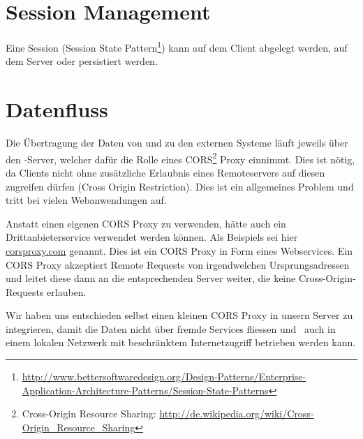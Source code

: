 \section{Session Management}
	Eine Session (Session State Pattern\footnote{\url{http://www.bettersoftwaredesign.org/Design-Patterns/Enterprise-Application-Architecture-Patterns/Session-State-Patterns}}) kann auf dem Client abgelegt werden, auf dem Server oder persistiert werden.
	
		
	\section{Datenfluss}			
		Die Übertragung der Daten von und zu den externen Systeme läuft jeweils über den \eeppi-Server, welcher dafür die Rolle eines CORS\footnote{Cross-Origin Resource Sharing: \url{http://de.wikipedia.org/wiki/Cross-Origin_Resource_Sharing}} Proxy einnimmt. 
		Dies ist nötig, da Clients nicht ohne zusätzliche Erlaubnis eines Remoteservers
		auf diesen zugreifen dürfen (Cross Origin Restriction).
		Dies ist ein allgemeines Problem und tritt bei vielen Webanwendungen auf.
		
		Anstatt einen eigenen CORS Proxy zu verwenden, hätte auch ein Drittanbieterservice verwendet werden können.
		Als Beispiels sei hier \hyperlink{http://www.corsproxy.com/}{corsproxy.com} genannt.
		Dies ist ein CORS Proxy in Form eines Webservices.
		Ein CORS Proxy akzeptiert Remote Requests von irgendwelchen Ursprungsadressen und leitet diese dann
		an die entsprechenden Server weiter, die keine Cross-Origin-Requests erlauben.
		
		Wir haben uns entschieden selbst einen kleinen CORS Proxy in unsern Server zu integrieren,
		damit die Daten nicht über fremde Services fliessen und
		\eeppi\ auch in einem lokalen Netzwerk mit beschränktem Internetzugriff betrieben werden kann.
	
